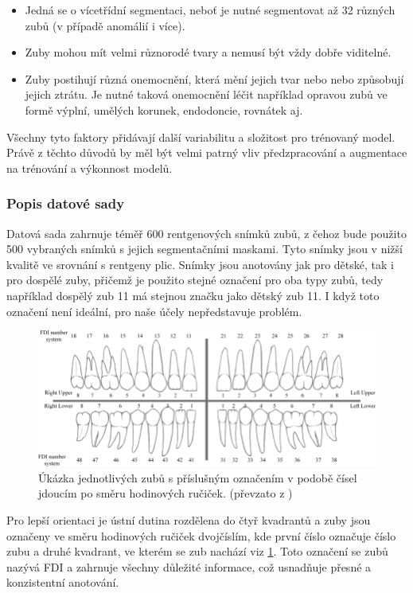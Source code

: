 \documentclass[male,czech,api_ing]{thesis}
\begin{document}
\begin{itemize}
    \item Jedná se o vícetřídní segmentaci, neboť je nutné segmentovat až 32 různých zubů (v případě anomálií i více).
    \item Zuby mohou mít velmi různorodé tvary a nemusí být vždy dobře viditelné.
    \item Zuby postihují různá onemocnění, která mění jejich tvar nebo nebo způsobují jejich ztrátu. Je nutné taková onemocnění léčit například opravou zubů ve formě výplní, umělých korunek, endodoncie, rovnátek aj.
\end{itemize}

Všechny tyto faktory přidávají další variabilitu a složitost pro trénovaný model. Právě z těchto důvodů by měl být velmi patrný vliv předzpracování a augmentace na trénování a výkonnost modelů.

\subsubsection{Popis datové sady}
Datová sada zahrnuje téměř 600 rentgenových snímků zubů, z čehoz bude použito 500 vybraných snímků s jejich segmentačními maskami. Tyto snímky jsou v nižší kvalitě ve srovnání s rentgeny plic. Snímky jsou anotovány jak pro dětské, tak i pro dospělé zuby, přičemž je použito stejné označení pro oba typy zubů, tedy například dospělý zub 11 má stejnou značku jako dětský zub 11. I když toto označení není ideální, pro naše účely nepředstavuje problém.

\begin{figure}[ht]
    \centering
    \includegraphics[width=\linewidth]{Prilohy/Obrazky/FDITeethLabels.png}
    \caption{Úkázka jednotlivých zubů s příslušným označením v podobě čísel jdoucím po směru hodinových ručiček. (převzato z \cite{teethLabelImg})}
    \label{fig:teethLabel}
\end{figure}

Pro lepší orientaci je ústní dutina rozdělena do čtyř kvadrantů a zuby jsou označeny ve směru hodinových ručiček dvojčíslím, kde první číslo označuje číslo zubu a druhé kvadrant, ve kterém se zub nachází viz \ref{fig:teethLabel}. Toto označení se zubů nazývá FDI a zahrnuje všechny důležité informace, což usnadňuje přesné a konzistentní anotování.
\end{document}
